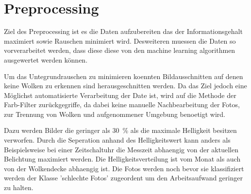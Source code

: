\section{Preprocessing}
\label{sec:03_Preprocessing}
Ziel des Preprocessing ist es die Daten aufzubereiten das der
Informationsgehalt maximiert sowie Rauschen minimiert wird.
Desweiteren muessen die Daten so vorverarbeitet werden, dass diese
diese von den machine learning algorithmen ausgewertet werden können. 

Um das Untegrundrauschen zu minimieren koennten Bildausschnitten auf 
denen keine Wolken zu erkennen sind herausgeschnitten werden.
Da das Ziel jedoch eine Möglichst automatisierte Verarbeitung der Date
ist, wird auf die Methode der Farb-Filter zurückgegriffe, da dabei keine
manuelle Nachbearbeitung der Fotos, zur Trennung von Wolken und 
aufgenommener Umgebung benoetigt wird.

Dazu werden Bilder die geringer als \SI{30}{\percent} als die maximale 
Helligkeit besitzen verworfen. 
Durch die Seperation anhand des Helligkeitswert kann anders als Beispielsweise
bei einer Zeitschaltuhr die Messzeit abhaengig von der aktuellen Belichtung 
maximiert werden.
Die Helligkeitsverteilung ist vom Monat als auch von der Wolkendecke abhaengig
ist.
Die Fotos werden noch bevor sie klassifiziert werden der Klasse 'schlechte Fotos' 
zugeordent um den Arbeitsaufwand geringer zu halten.

